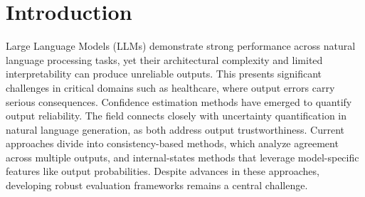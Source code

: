 \section{Introduction}\label{sec:intro}

Large Language Models (LLMs) demonstrate strong performance across natural language processing tasks, yet their architectural complexity and limited interpretability can produce unreliable outputs. 
This presents significant challenges in critical domains such as healthcare, where output errors carry serious consequences. 
Confidence estimation methods have emerged to quantify output reliability. 
The field connects closely with uncertainty quantification in natural language generation, as both address output trustworthiness. 
Current approaches divide into consistency-based methods, which analyze agreement across multiple outputs, and internal-states methods that leverage model-specific features like output probabilities.
Despite advances in these approaches, developing robust evaluation frameworks remains a central challenge.




